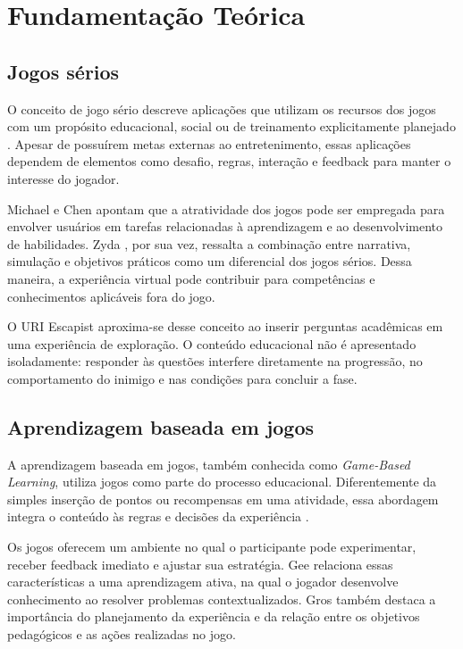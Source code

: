 \documentclass[12pt]{article}
\begin{document}
\section{Fundamentação Teórica}

\subsection{Jogos sérios}

O conceito de jogo sério descreve aplicações que utilizam os recursos dos jogos com um propósito educacional, social ou de treinamento explicitamente planejado \cite{abt1970}. Apesar de possuírem metas externas ao entretenimento, essas aplicações dependem de elementos como desafio, regras, interação e feedback para manter o interesse do jogador.

Michael e Chen \cite{michael2006} apontam que a atratividade dos jogos pode ser empregada para envolver usuários em tarefas relacionadas à aprendizagem e ao desenvolvimento de habilidades. Zyda \cite{zyda2005}, por sua vez, ressalta a combinação entre narrativa, simulação e objetivos práticos como um diferencial dos jogos sérios. Dessa maneira, a experiência virtual pode contribuir para competências e conhecimentos aplicáveis fora do jogo.

O URI Escapist aproxima-se desse conceito ao inserir perguntas acadêmicas em uma experiência de exploração. O conteúdo educacional não é apresentado isoladamente: responder às questões interfere diretamente na progressão, no comportamento do inimigo e nas condições para concluir a fase.

\subsection{Aprendizagem baseada em jogos}

A aprendizagem baseada em jogos, também conhecida como \textit{Game-Based Learning}, utiliza jogos como parte do processo educacional. Diferentemente da simples inserção de pontos ou recompensas em uma atividade, essa abordagem integra o conteúdo às regras e decisões da experiência \cite{prensky2001}.

Os jogos oferecem um ambiente no qual o participante pode experimentar, receber feedback imediato e ajustar sua estratégia. Gee \cite{gee2003} relaciona essas características a uma aprendizagem ativa, na qual o jogador desenvolve conhecimento ao resolver problemas contextualizados. Gros \cite{gros2007} também destaca a importância do planejamento da experiência e da relação entre os objetivos pedagógicos e as ações realizadas no jogo.
\end{document}
